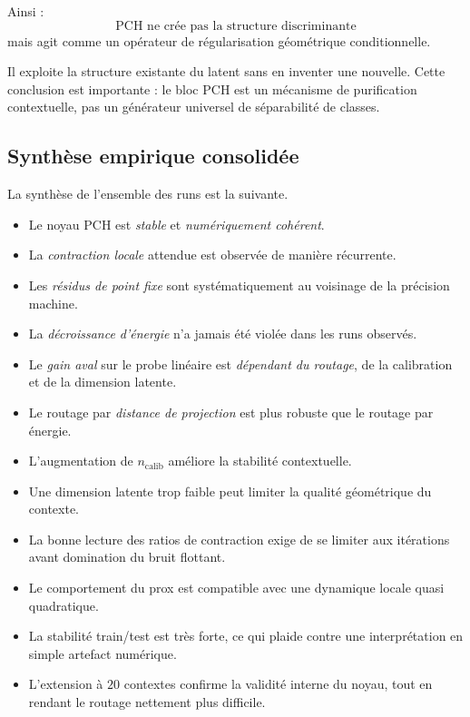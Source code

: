 \documentclass[11pt,a4paper]{article}
\newcommand{\1}{\mathbf 1}
\begin{document}
Ainsi :
\[
\text{PCH ne crée pas la structure discriminante}
\]
mais agit comme un opérateur de régularisation géométrique conditionnelle.

Il exploite la structure existante du latent sans en inventer une nouvelle. Cette conclusion est importante : le bloc PCH est un mécanisme de purification contextuelle, pas un générateur universel de séparabilité de classes.

\subsection{Synthèse empirique consolidée}

La synthèse de l’ensemble des runs est la suivante.

\begin{itemize}[leftmargin=2em]
    \item Le noyau PCH est \emph{stable} et \emph{numériquement cohérent}.
    \item La \emph{contraction locale} attendue est observée de manière récurrente.
    \item Les \emph{résidus de point fixe} sont systématiquement au voisinage de la précision machine.
    \item La \emph{décroissance d’énergie} n’a jamais été violée dans les runs observés.
    \item Le \emph{gain aval} sur le probe linéaire est \emph{dépendant du routage}, de la calibration et de la dimension latente.
    \item Le routage par \emph{distance de projection} est plus robuste que le routage par énergie.
    \item L’augmentation de \(n_{\mathrm{calib}}\) améliore la stabilité contextuelle.
    \item Une dimension latente trop faible peut limiter la qualité géométrique du contexte.
    \item La bonne lecture des ratios de contraction exige de se limiter aux itérations avant domination du bruit flottant.
    \item Le comportement du prox est compatible avec une dynamique locale quasi quadratique.
    \item La stabilité train/test est très forte, ce qui plaide contre une interprétation en simple artefact numérique.
    \item L’extension à \(20\) contextes confirme la validité interne du noyau, tout en rendant le routage nettement plus difficile.
\end{itemize}
\end{document}
